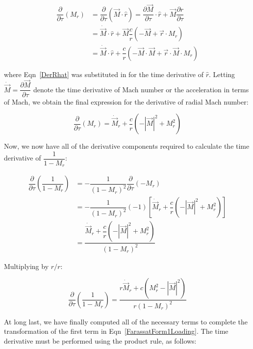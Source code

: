 \documentclass[]{aiaa-tc}%
\begin{document}
\begin{align*}
\dfrac{\partial}{\partial\tau} \left( M_r \right)
&= \dfrac{\partial}{\partial\tau} \left( \vec{M} \cdot \hat{r} \right)
= \dfrac{\partial\vec{M}}{\partial\tau}
    \cdot\hat{r} + \vec{M} \dfrac{\partial\hat{r}}{\partial\tau} \\
&= \dot{\vec{M}}\cdot\hat{r} + \vec{M} \dfrac{c}{r}
    \left( -\vec{M} + \vec{r} \cdot M_r \right) \\
&= \dot{\vec{M}}\cdot\hat{r} + \dfrac{c}{r}
    \left( -\vec{M}\cdot\vec{M} + \vec{r} \cdot\vec{M}\cdot M_r \right)
\end{align*}

\noindent where Eqn~\ref{DerRhat} was substituted in for the time derivative of $\hat{r}$.  Letting $\dot{\vec{M}} = \dfrac{\partial \vec{M}}{\partial \tau}$ denote the time derivative of Mach number or the acceleration in terms of Mach, we obtain the final expression for the derivative of radial Mach number:

\begin{equation} \label{DerMr}
\dfrac{\partial}{\partial\tau} \left( M_r \right)
= \dot{\vec{M}}_r + \dfrac{c}{r}
    \left( -|\vec{M}|^2 + M_r^2 \right)
\end{equation}

Now, we now have all of the derivative components required to calculate the time derivative of $\dfrac{1}{1 - M_r}$:

\begin{align*}
\dfrac{\partial}{\partial\tau} \left( \dfrac{1}{1 - M_r} \right)
&= -\dfrac{1}{(1 - M_r)^2} \dfrac{\partial}{\partial\tau}(-M_r) \\
&= -\dfrac{1}{(1 - M_r)^2}(-1) \left[
    \dot{\vec{M}}_r +\dfrac{c}{r}\left( -|\vec{M}|^2 + M_r^2 \right) \right] \\
&= \dfrac{ \dot{\vec{M}}_r + \dfrac{c}{r} \left( -|\vec{M}|^2 + M_r^2 \right) }
    {(1 - M_r)^2}
\end{align*}

\noindent Multiplying by $r/r$:

\begin{equation} \label{DerMrDenom}
\dfrac{\partial}{\partial\tau} \left( \dfrac{1}{1 - M_r} \right)
= \dfrac{ r\dot{\vec{M}}_r + c \left( M_r^2 - |\vec{M}|^2 \right) }
    {r (1 - M_r)^2}
\end{equation}

At long last, we have finally computed all of the necessary terms to complete the transformation of the first term in Eqn~\ref{FarassatForm1Loading}.  The time derivative must be performed using the product rule, as follows:
\end{document}
